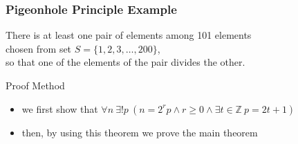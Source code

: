 \documentclass[dvipsnames]{beamer}
\begin{document}
\begin{frame}
  \frametitle{Pigeonhole Principle Example}

  \begin{theorem}
    There is at least one pair of elements among 101 elements\\
    chosen from set $S = \{1,2,3,\dots,200\}$,\\
    so that one of the elements of the pair divides the other.
  \end{theorem}

  \pause
  \begin{block}{Proof Method}
    \begin{itemize}
      \item we first show that
         $\forall n~\exists ! p~(n = 2^r p \wedge r \geq 0 \wedge \exists t \in \mathbb Z~p = 2t + 1)$\\

      \item then, by using this theorem we prove the main theorem
    \end{itemize}
  \end{block}
\end{frame}
\end{document}
